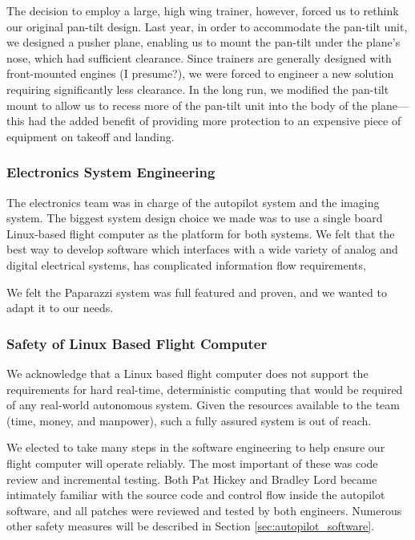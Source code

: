\documentclass[10pt]{report}
\begin{document}
The decision to employ a large, high wing trainer, however, forced us to rethink our original pan-tilt design. Last year, in order to accommodate the pan-tilt unit, we designed a pusher plane, enabling us to mount the pan-tilt under the plane's nose, which had sufficient clearance. Since trainers are generally designed with front-mounted engines (I presume?), we were forced to engineer a new solution requiring significantly less clearance. In the long run, we modified the pan-tilt mount to allow us to recess more of the pan-tilt unit into the body of the plane---this had the added benefit of providing more protection to an expensive piece of equipment on takeoff and landing.

\subsubsection{Electronics System Engineering}

The electronics team was in charge of the autopilot system and the imaging system. The biggest system design choice we made was to use a single board Linux-based flight computer as the platform for both systems. We felt that the best way to develop software which interfaces with a wide variety of analog and digital electrical systems, has complicated information flow requirements, 

We felt the Paparazzi system was full featured and proven, and we wanted to adapt it to our needs.

\subsubsection{Safety of Linux Based Flight Computer}

We acknowledge that a Linux based flight computer does not support the requirements for hard real-time, deterministic computing that would be required of any real-world autonomous system. Given the resources available to the team (time, money, and manpower), such a fully assured system is out of reach. 

We elected to take many steps in the software engineering to help ensure our flight computer will operate reliably. The most important of these was code review and incremental testing. Both Pat Hickey and Bradley Lord became intimately familiar with the source code and control flow inside the autopilot software, and all patches were reviewed and tested by both engineers. Numerous other safety measures will be described in Section \ref{sec:autopilot_software}.
\end{document}
